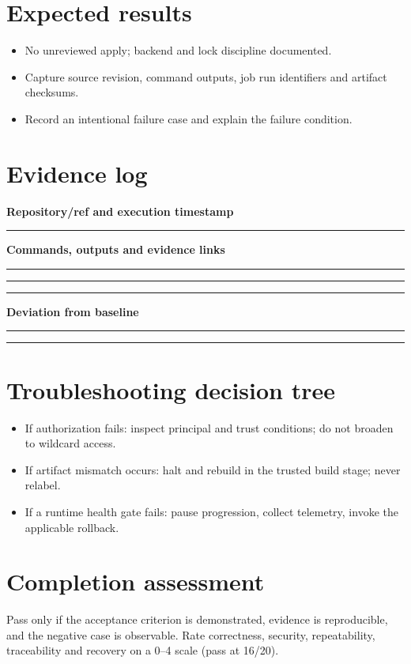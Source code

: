 \documentclass[10pt,letterpaper]{article}
\begin{document}
\section{Expected results}
\begin{itemize}
\item No unreviewed apply; backend and lock discipline documented.
\item Capture source revision, command outputs, job run identifiers and artifact checksums.
\item Record an intentional failure case and explain the failure condition.
\end{itemize}

\section{Evidence log}
\textbf{Repository/ref and execution timestamp}\par
\noindent\rule{\linewidth}{0.35pt}\par\vspace{0.7em}
\textbf{Commands, outputs and evidence links}\par
\noindent\rule{\linewidth}{0.35pt}\par\vspace{0.7em}
\noindent\rule{\linewidth}{0.35pt}\par\vspace{0.7em}
\noindent\rule{\linewidth}{0.35pt}\par\vspace{0.7em}
\textbf{Deviation from baseline}\par
\noindent\rule{\linewidth}{0.35pt}\par\vspace{0.7em}
\noindent\rule{\linewidth}{0.35pt}\par\vspace{0.7em}

\section{Troubleshooting decision tree}
\begin{itemize}
\item If authorization fails: inspect principal and trust conditions; do not broaden to wildcard access.
\item If artifact mismatch occurs: halt and rebuild in the trusted build stage; never relabel.
\item If a runtime health gate fails: pause progression, collect telemetry, invoke the applicable rollback.
\end{itemize}

\section{Completion assessment}
Pass only if the acceptance criterion is demonstrated, evidence is reproducible, and the negative case is observable. Rate correctness, security, repeatability, traceability and recovery on a 0--4 scale (pass at 16/20).
\end{document}

